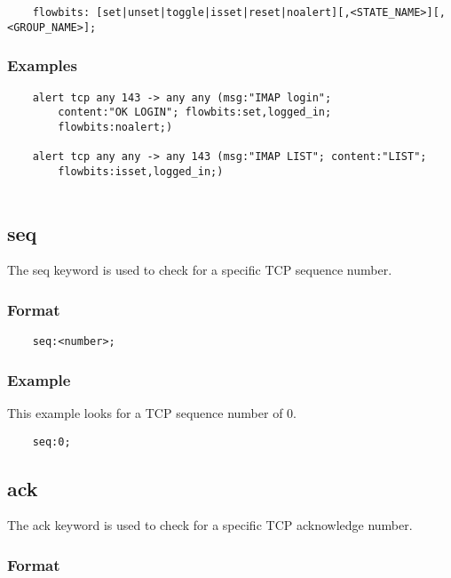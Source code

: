 \documentclass[english]{report}
\begin{document}
\begin{verbatim}
    flowbits: [set|unset|toggle|isset|reset|noalert][,<STATE_NAME>][,<GROUP_NAME>];
\end{verbatim}

\subsubsection{Examples}

\begin{verbatim}
    alert tcp any 143 -> any any (msg:"IMAP login"; 
        content:"OK LOGIN"; flowbits:set,logged_in; 
        flowbits:noalert;)
      
    alert tcp any any -> any 143 (msg:"IMAP LIST"; content:"LIST"; 
        flowbits:isset,logged_in;)
	
\end{verbatim}

\subsection{seq}

The seq keyword is used to check for a specific TCP sequence number.

\subsubsection{Format}

\begin{verbatim}
    seq:<number>;
\end{verbatim}

\subsubsection{Example}

This example looks for a TCP sequence number of 0.

\begin{verbatim}
    seq:0;
\end{verbatim}

\subsection{ack}

The ack keyword is used to check for a specific TCP acknowledge number.

\subsubsection{Format}
\end{document}
